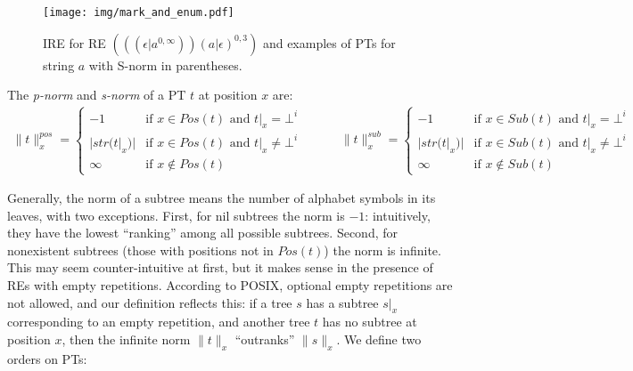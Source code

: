 \documentclass[AMA,STIX1COL]{WileyNJD-v2}
\newcommand{\pnorm}[2]{\|{#1}\|^{pos}_{#2}}
\newcommand{\snorm}[2]{\|{#1}\|^{sub}_{#2}}
\begin{document}
\begin{figure}[t!]
\texttt{[image: img/mark\_and\_enum.pdf]}
\vspace{-2em}
\caption{
IRE for RE $(((\epsilon|a^{0,\infty}))(a|\epsilon)^{0,3})$
and examples of PTs for string $a$
with S-norm in parentheses.
}\label{fig:mark_and_enum}
\end{figure}

\FloatBarrier

    \begin{definition}\label{tnorm_of_PTs}
    The \emph{p-norm} and \emph{s-norm} of a PT $t$ at position $x$ are:
    \begin{align*}
        \pnorm{t}{x} =
            \begin{cases}
                -1          &\text{if } x \in Pos(t) \text{ and } t|_x = \bot^i  \\[-0.2em]
                |str(t|_x)| &\text{if } x \in Pos(t) \text{ and } t|_x \neq \bot^i \\[-0.2em]
                \infty      &\text{if } x \not\in Pos(t)
            \end{cases}
    \quad\quad\quad
        \snorm{t}{x} =
            \begin{cases}
                -1          &\text{if } x \in Sub(t) \text{ and } t|_x = \bot^i  \\[-0.2em]
                |str(t|_x)| &\text{if } x \in Sub(t) \text{ and } t|_x \neq \bot^i \\[-0.2em]
                \infty      &\text{if } x \not\in Sub(t)
            \end{cases}
    \end{align*}
    \end{definition}

Generally, the norm of a subtree means the number of alphabet symbols in its leaves, with two exceptions.
First, for nil subtrees the norm is $-1$: intuitively, they have the lowest ``ranking'' among all possible subtrees.
Second, for nonexistent subtrees (those with positions not in $Pos(t)$) the norm is infinite.
This may seem counter-intuitive at first, but it makes sense in the presence of REs with empty repetitions.
According to POSIX, optional empty repetitions are not allowed, and our definition reflects this:
if a tree $s$ has a subtree $s|_x$ corresponding to an empty repetition,
and another tree $t$ has no subtree at position $x$,
then the infinite norm $\|t\|_x$ ``outranks'' $\|s\|_x$.
We define two orders on PTs:
\end{document}
